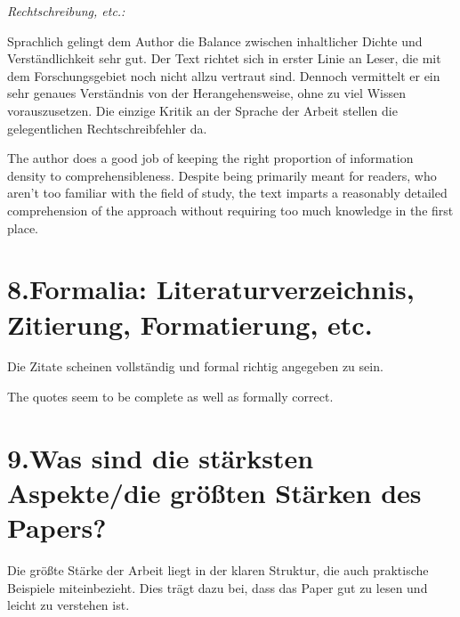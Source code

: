 \documentclass{article}
\begin{document}
\noindent{}   \emph{Rechtschreibung, etc.:}%

   Sprachlich gelingt dem Author die Balance zwischen inhaltlicher Dichte und Verständlichkeit sehr gut. Der Text richtet sich in erster Linie an Leser, die mit dem Forschungsgebiet noch nicht allzu vertraut sind. Dennoch vermittelt er ein sehr genaues Verständnis von der Herangehensweise, ohne zu viel Wissen vorauszusetzen.
   Die einzige Kritik an der Sprache der Arbeit stellen die gelegentlichen Rechtschreibfehler da.%

\mdhr{}%

\noindent{}   The author does a good job of keeping the right proportion of information density to comprehensibleness. Despite being primarily meant for readers, who aren't too familiar with the field of study, the text imparts a reasonably detailed comprehension of the approach without requiring too much knowledge in the first place.%

\section{8.\hspace*{0.5em}Formalia: Literaturverzeichnis, Zitierung, Formatierung, etc.}\label{sec-formalia--literaturverzeichnis-zitierung-formatierung-etc}%

\noindent{}   Die Zitate scheinen vollständig und formal richtig angegeben zu sein.%

\mdhr{}%

\noindent{}   The quotes seem to be complete as well as formally correct.%

\section{9.\hspace*{0.5em}Was sind die stärksten Aspekte/die größten Stärken des Papers?}\label{sec-was-sind-die-strksten-aspektedie-grten-strken-des-papers}%

\noindent{}  Die größte Stärke der Arbeit liegt in der klaren Struktur, die auch praktische Beispiele miteinbezieht. Dies trägt dazu bei, dass das Paper gut zu lesen und leicht zu verstehen ist.%
\end{document}
